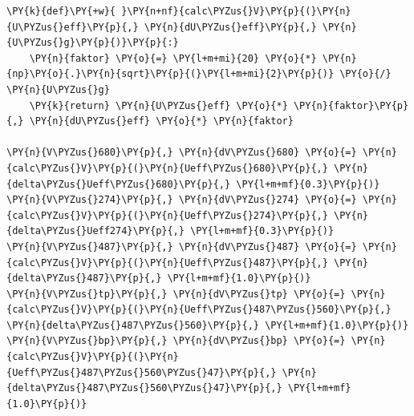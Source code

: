     \begin{tcolorbox}[breakable, size=fbox, boxrule=1pt, pad at break*=1mm,colback=cellbackground, colframe=cellborder]
\begin{Verbatim}[commandchars=\\\{\}]
\PY{k}{def}\PY{+w}{ }\PY{n+nf}{calc\PYZus{}V}\PY{p}{(}\PY{n}{U\PYZus{}eff}\PY{p}{,} \PY{n}{dU\PYZus{}eff}\PY{p}{,} \PY{n}{U\PYZus{}g}\PY{p}{)}\PY{p}{:}
    \PY{n}{faktor} \PY{o}{=} \PY{l+m+mi}{20} \PY{o}{*} \PY{n}{np}\PY{o}{.}\PY{n}{sqrt}\PY{p}{(}\PY{l+m+mi}{2}\PY{p}{)} \PY{o}{/} \PY{n}{U\PYZus{}g}
    \PY{k}{return} \PY{n}{U\PYZus{}eff} \PY{o}{*} \PY{n}{faktor}\PY{p}{,} \PY{n}{dU\PYZus{}eff} \PY{o}{*} \PY{n}{faktor}

\PY{n}{V\PYZus{}680}\PY{p}{,} \PY{n}{dV\PYZus{}680} \PY{o}{=} \PY{n}{calc\PYZus{}V}\PY{p}{(}\PY{n}{Ueff\PYZus{}680}\PY{p}{,} \PY{n}{delta\PYZus{}Ueff\PYZus{}680}\PY{p}{,} \PY{l+m+mf}{0.3}\PY{p}{)}
\PY{n}{V\PYZus{}274}\PY{p}{,} \PY{n}{dV\PYZus{}274} \PY{o}{=} \PY{n}{calc\PYZus{}V}\PY{p}{(}\PY{n}{Ueff\PYZus{}274}\PY{p}{,} \PY{n}{delta\PYZus{}Ueff274}\PY{p}{,} \PY{l+m+mf}{0.3}\PY{p}{)}
\PY{n}{V\PYZus{}487}\PY{p}{,} \PY{n}{dV\PYZus{}487} \PY{o}{=} \PY{n}{calc\PYZus{}V}\PY{p}{(}\PY{n}{Ueff\PYZus{}487}\PY{p}{,} \PY{n}{delta\PYZus{}487}\PY{p}{,} \PY{l+m+mf}{1.0}\PY{p}{)}
\PY{n}{V\PYZus{}tp}\PY{p}{,} \PY{n}{dV\PYZus{}tp} \PY{o}{=} \PY{n}{calc\PYZus{}V}\PY{p}{(}\PY{n}{Ueff\PYZus{}487\PYZus{}560}\PY{p}{,} \PY{n}{delta\PYZus{}487\PYZus{}560}\PY{p}{,} \PY{l+m+mf}{1.0}\PY{p}{)}
\PY{n}{V\PYZus{}bp}\PY{p}{,} \PY{n}{dV\PYZus{}bp} \PY{o}{=} \PY{n}{calc\PYZus{}V}\PY{p}{(}\PY{n}{Ueff\PYZus{}487\PYZus{}560\PYZus{}47}\PY{p}{,} \PY{n}{delta\PYZus{}487\PYZus{}560\PYZus{}47}\PY{p}{,} \PY{l+m+mf}{1.0}\PY{p}{)}


\end{Verbatim}
\end{tcolorbox}
